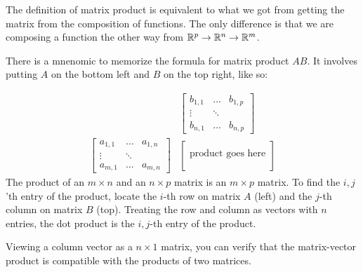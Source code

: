 \begin{remark}
	The definition of matrix product is equivalent to what we got from getting the matrix from the composition of functions.
	The only difference is that we are composing a function the other way from $\mathbb{R}^p\to\mathbb{R}^n\to\mathbb{R}^m$.
\end{remark}
\begin{remark}
	There is a mnenomic to memorize the formula for matrix product $AB$. It involves putting $A$ on the bottom left and $B$ on the top right, like so:

	\[
	\begin{array}{cc}
		&\begin{bmatrix}
			b_{1,1} & \ldots & b_{1,p}\\
			\vdots & \ddots&\\
			b_{n,1} & \ldots & b_{n,p}
		\end{bmatrix}\\
		\begin{bmatrix}
			a_{1,1} & \ldots & a_{1,n}\\
			\vdots & \ddots&\\
			a_{m,1} & \ldots & a_{m,n}
		\end{bmatrix}	& \begin{bmatrix}\\
			\textrm{product goes here}\\
			\\
		\end{bmatrix}
	\end{array}
	\]
	The product of an $m\times n$ and an $n\times p$ matrix is an $m\times p$ matrix. To find the $i,j$'th entry of the product,
	locate the $i$-th row on matrix $A$ (left) and the $j$-th column on matrix $B$ (top). Treating the row and column as vectors with $n$ entries, the dot product is the $i,j$-th entry of the product.
\end{remark}
\begin{remark}
	Viewing a column vector as a $n\times 1$ matrix, you can verify that the matrix-vector product is compatible with the products of two matrices.
\end{remark}

